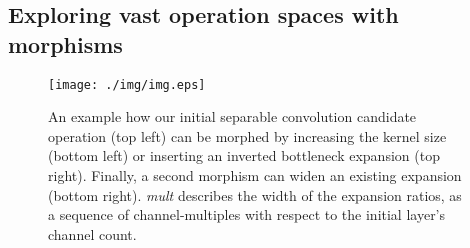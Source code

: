 \documentclass[conference]{IEEEtran}
\begin{document}
\subsection{Exploring vast operation spaces with morphisms}
\label{ss_methods_prog}
\label{sss_methods_morphing}





\begin{figure}[htbp]
	\centerline{\texttt{[image: ./img/img.eps]}}
	\caption{
		An example how our initial separable convolution candidate operation (top left) can be morphed by increasing the kernel size (bottom left) or inserting an inverted bottleneck expansion \cite{net_mobv2} (top right). Finally, a second morphism can widen an existing expansion (bottom right). \textit{mult} describes the width of the expansion ratios, as a sequence of channel-multiples with respect to the initial layer's channel count.
	}
	\label{fig_conv}
\end{figure}
\end{document}
